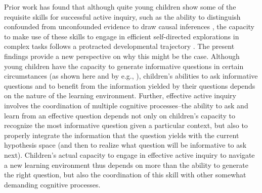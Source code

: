 \documentclass[man,floatsintext]{apa6}
\begin{document}

Prior work has found that although quite young children show some of the requisite skills for successful active inquiry, such as the ability to distinguish confounded from unconfounded evidence to draw causal inferences \cite{Gopnik:2001,Kushnir:2005,Kushnir:2007,Schulz:2004}, the capacity to make use of these skills to engage in efficient self-directed explorations in complex tasks follows a protracted developmental trajectory \cite{Chen:1999}. The present findings provide a new perspective on why this might be the case. Although young children have the capacity to generate informative questions in certain circumstances (as shown here and by e.g., \cite{Ruggeri:2015}), children's abilities to ask informative questions and to benefit from the information yielded by their questions depends on the nature of the learning environment. Further, effective active inquiry involves the coordination of multiple cognitive processes--the ability to ask and learn from an effective question depends not only on children's capacity to recognize the most informative question given a particular context, but also to properly integrate the information that the question yields with the current hypothesis space (and then to realize what question will be informative to ask next). Children's actual capacity to engage in effective active inquiry to navigate a new learning environment thus depends on more than the ability to generate the right question, but also the coordination of this skill with other somewhat demanding cognitive processes.  
\end{document}
